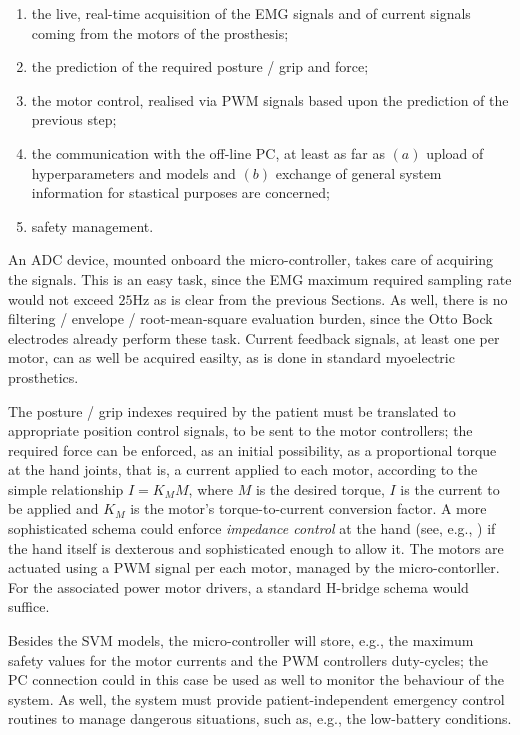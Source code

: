 \begin{enumerate}

  \item the live, real-time acquisition of the EMG signals and of
    current signals coming from the motors of the prosthesis;

  \item the prediction of the required posture / grip and force;

  \item the motor control, realised via PWM signals based upon the
    prediction of the previous step;

  \item the communication with the off-line PC, at least as far as
    $(a)$ upload of hyperparameters and models and $(b)$ exchange of
    general system information for stastical purposes are concerned;

  \item safety management.

\end{enumerate}

An ADC device, mounted onboard the micro-controller, takes care of
acquiring the signals. This is an easy task, since the EMG maximum
required sampling rate would not exceed $25$Hz as is clear from the
previous Sections. As well, there is no filtering / envelope /
root-mean-square evaluation burden, since the Otto Bock electrodes
already perform these task. Current feedback signals, at least one per
motor, can as well be acquired easilty, as is done in standard
myoelectric prosthetics.

The posture / grip indexes required by the patient must be translated
to appropriate position control signals, to be sent to the motor
controllers; the required force can be enforced, as an initial
possibility, as a proportional torque at the hand joints, that is, a
current applied to each motor, according to the simple relationship $I
= K_M M$, where $M$ is the desired torque, $I$ is the current to be
applied and $K_M$ is the motor's torque-to-current conversion
factor. A more sophisticated schema could enforce \emph{impedance
control} at the hand (see, e.g., \cite{alin}) if the hand itself is
dexterous and sophisticated enough to allow it. The motors are
actuated using a PWM signal per each motor, managed by the
micro-contorller. For the associated power motor drivers, a standard
H-bridge schema would suffice.

Besides the SVM models, the micro-controller will store, e.g., the
maximum safety values for the motor currents and the PWM controllers
duty-cycles; the PC connection could in this case be used as well to
monitor the behaviour of the system. As well, the system must provide
patient-independent emergency control routines to manage dangerous
situations, such as, e.g., the low-battery conditions.
